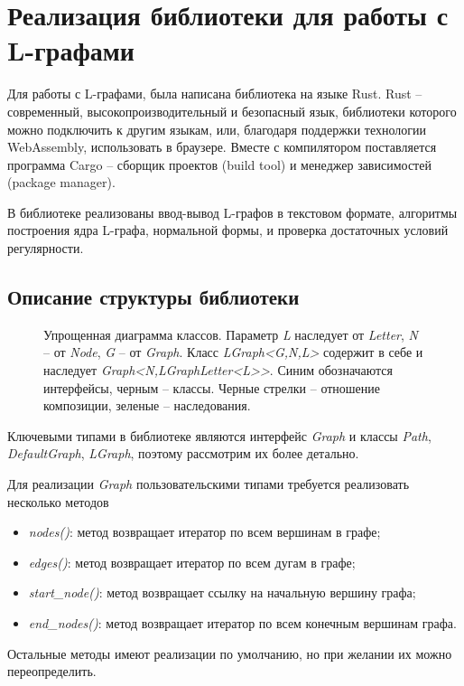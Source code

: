 \chapter{Реализация библиотеки для работы с L-графами}

Для работы с L-графами, была написана библиотека на языке Rust. 
Rust -- современный, высокопроизводительный и безопасный язык, библиотеки которого
можно подключить к другим языкам, или, благодаря поддержки технологии WebAssembly, использовать
в браузере. Вместе с компилятором поставляется программа Cargo -- сборщик проектов (build tool) и менеджер
зависимостей (package manager). 

В библиотеке реализованы ввод-вывод L-графов в текстовом формате, 
алгоритмы построения ядра L-графа, нормальной формы, и проверка достаточных условий регулярности.

\section{Описание структуры библиотеки}

\begin{figure}[h]
    \centering
    
    \caption{
        Упрощенная диаграмма классов. Параметр \emph{L} наследует от \emph{Letter}, \emph{N} -- от \emph{Node}, \emph{G} -- от \emph{Graph}.
        Класс \emph{LGraph<G,N,L>} содержит в себе и наследует \emph{Graph<N,LGraphLetter<L>{}>}.
        Синим обозначаются интерфейсы, черным -- классы.
        Черные стрелки -- отношение композиции, зеленые -- наследования.
    }
    \label{arch-image}
\end{figure}

Ключевыми типами в библиотеке являются интерфейс \emph{Graph} и классы \emph{Path}, \emph{DefaultGraph}, \emph{LGraph}, 
поэтому рассмотрим их более детально.

Для реализации \emph{Graph} пользовательскими типами требуется реализовать несколько методов
\begin{itemize}
    \item \emph{nodes()}: метод возвращает итератор по всем вершинам в графе;
    \item \emph{edges()}: метод возвращает итератор по всем дугам в графе;
    \item \emph{start\_node()}: метод возвращает ссылку на начальную вершину графа;
    \item \emph{end\_nodes()}: метод возвращает итератор по всем конечным вершинам графа.
\end{itemize}
Остальные методы имеют реализации по умолчанию, но при желании их можно переопределить.

